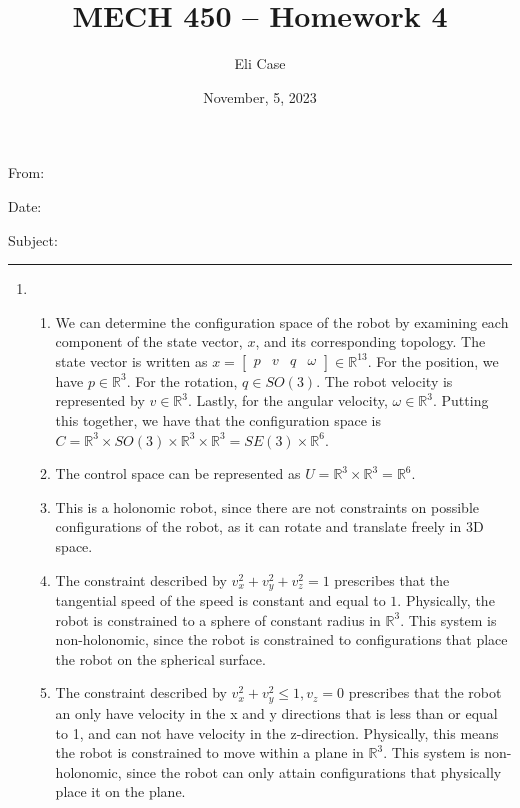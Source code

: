 \documentclass[11pt]{article}
\author{Eli Case}
\title{MECH 450 -- Homework 4}
\date{November, 5, 2023}
\begin{document}
\flushleft
\thispagestyle{plain}

From: \@author

Date: \@date

Subject: \@title

\makeatother
\medskip
\hrule
\medskip

\begin{enumerate}[leftmargin=0.3in]

   \item %
   \begin{enumerate}
       \item We can determine the configuration space of the robot by examining each component of the state vector, $x$, and its corresponding topology. The state vector is written as $x = \begin{bmatrix} 
               p & v & q & \omega 
           \end{bmatrix} \in \mathbb{R}^{13}$. For the position, we have $p \in \mathbb{R}^3$. For the rotation, $q \in SO(3)$. The robot velocity is represented by $v \in \mathbb{R}^3$. Lastly, for the angular velocity, $\omega \in \mathbb{R}^3$. Putting this together, we have that the configuration space is $C = \mathbb{R}^3 \times SO(3) \times \mathbb{R}^3 \times \mathbb{R}^3 = SE(3) \times \mathbb{R}^6$.

       \item  The control space can be represented as $U = \mathbb{R}^3 \times \mathbb{R}^3 = \mathbb{R}^6$.

       \item This is a holonomic robot, since there are not constraints on possible configurations of the robot, as it can rotate and translate freely in 3D space. 

       \item The constraint described by $v_x^2 + v_y^2 + v_z^2 = 1$ prescribes that the tangential speed of the speed is constant and equal to $1$. Physically, the robot is constrained to a sphere of constant radius in $\mathbb{R}^3$. This system is non-holonomic, since the robot is constrained to configurations that place the robot on the spherical surface.

       \item The constraint described by $v_x^2 + v_y^2 \leq 1, v_z = 0$ prescribes that the robot an only have velocity in the x and y directions that is less than or equal to 1, and can not have velocity in the z-direction. Physically, this means the robot is constrained to move within a plane in $\mathbb{R}^3$. This system is non-holonomic, since the robot can only attain configurations that physically place it on the plane.


\end{enumerate}
\end{enumerate}
\end{document}
